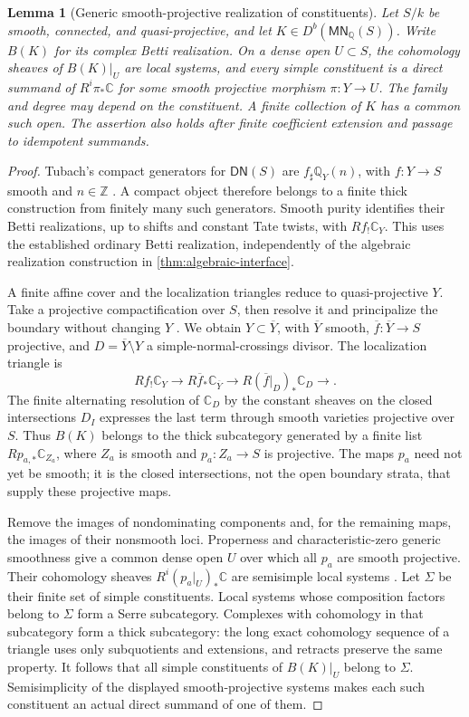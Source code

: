 \documentclass[11pt]{article}
\numberwithin{equation}{section}
\newtheorem{lemma}[lemma]{Lemma}
\theoremstyle{definition}
\theoremstyle{remark}
\newcommand{\Q}{\mathbb Q}
\newcommand{\C}{\mathbb C}
\newcommand{\MN}{\mathsf{MN}}
\begin{document}
\begin{lemma}[Generic smooth-projective realization of constituents]
\label{lem:projective-constituents}
Let $S/k$ be smooth, connected, and quasi-projective, and let
$K\in D^b(\MN_{\Q}(S))$. Write $B(K)$ for its complex Betti
realization. On a dense open $U\subset S$, the cohomology sheaves of
$B(K)|_U$ are local systems, and every simple constituent is a direct
summand of $R^i\pi_*\C$ for some smooth projective morphism
$\pi:Y\to U$. The family and degree may depend on the constituent.
A finite collection of $K$ has a common such open. The assertion also
holds after finite coefficient extension and passage to idempotent
summands.
\end{lemma}
\begin{proof}
Tubach's compact generators for $\mathsf{DN}(S)$ are
$f_\sharp\Q_Y(n)$, with $f:Y\to S$ smooth and $n\in\mathbb Z$
\cite[Corollary~4.19]{Tubach}. A compact object therefore belongs to a
finite thick construction from finitely many such generators. Smooth
purity identifies their Betti realizations, up to shifts and constant
Tate twists, with $Rf_!\C_Y$. This uses the established ordinary Betti
realization, independently of the algebraic realization construction in
\cref{thm:algebraic-interface}.

A finite affine cover and the localization triangles reduce to
quasi-projective $Y$. Take a projective compactification over $S$, then
resolve it and principalize the boundary without changing $Y$
\cite[Theorems~35--36]{KollarResolution}. We obtain
$Y\subset\overline Y$, with $\overline Y$ smooth,
$\overline f:\overline Y\to S$ projective, and
$D=\overline Y\setminus Y$ a simple-normal-crossings divisor. The
localization triangle is
\[
 Rf_!\C_Y\longrightarrow R\overline f_*\C_{\overline Y}
 \longrightarrow R(\overline f|_D)_*\C_D\longrightarrow.
\]
The finite alternating resolution of $\C_D$ by the constant sheaves on
the closed intersections $D_I$ expresses the last term through smooth
varieties projective over $S$. Thus $B(K)$ belongs to the thick
subcategory generated by a finite list $Rp_{a,*}\C_{Z_a}$, where
$Z_a$ is smooth and $p_a:Z_a\to S$ is projective. The maps $p_a$ need
not yet be smooth; it is the closed intersections, not the open boundary
strata, that supply these projective maps.

Remove the images of nondominating components and, for the remaining
maps, the images of their nonsmooth loci. Properness and characteristic-zero
generic smoothness give a common dense open $U$ over which all $p_a$
are smooth projective. Their cohomology sheaves $R^i(p_a|_U)_*\C$ are
semisimple local systems
\cite[Proposition~4.2.5 and Theorem~4.2.6]{DeligneHodgeII}.
Let $\Sigma$ be their finite set of simple constituents. Local systems
whose composition factors belong to $\Sigma$ form a Serre subcategory.
Complexes with cohomology in that subcategory form a thick subcategory:
the long exact cohomology sequence of a triangle uses only subquotients
and extensions, and retracts preserve the same property. It follows that
all simple constituents of $B(K)|_U$ belong to $\Sigma$. Semisimplicity
of the displayed smooth-projective systems makes each such constituent
an actual direct summand of one of them.


\end{proof}
\end{document}
